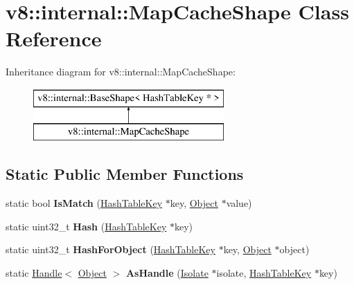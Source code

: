 \hypertarget{classv8_1_1internal_1_1_map_cache_shape}{}\section{v8\+:\+:internal\+:\+:Map\+Cache\+Shape Class Reference}
\label{classv8_1_1internal_1_1_map_cache_shape}
Inheritance diagram for v8\+:\+:internal\+:\+:Map\+Cache\+Shape\+:\begin{figure}[H]
\begin{center}
\leavevmode
\includegraphics[height=2.000000cm]{classv8_1_1internal_1_1_map_cache_shape}
\end{center}
\end{figure}
\subsection*{Static Public Member Functions}
\begin{DoxyCompactItemize}
\item 
\hypertarget{classv8_1_1internal_1_1_map_cache_shape_ab335975663862b94b68861fafc5661ee}{}static bool {\bfseries Is\+Match} (\hyperlink{classv8_1_1internal_1_1_hash_table_key}{Hash\+Table\+Key} $\ast$key, \hyperlink{classv8_1_1internal_1_1_object}{Object} $\ast$value)\label{classv8_1_1internal_1_1_map_cache_shape_ab335975663862b94b68861fafc5661ee}

\item 
\hypertarget{classv8_1_1internal_1_1_map_cache_shape_a90f50d2ad832b29efc03dd4655c62521}{}static uint32\+\_\+t {\bfseries Hash} (\hyperlink{classv8_1_1internal_1_1_hash_table_key}{Hash\+Table\+Key} $\ast$key)\label{classv8_1_1internal_1_1_map_cache_shape_a90f50d2ad832b29efc03dd4655c62521}

\item 
\hypertarget{classv8_1_1internal_1_1_map_cache_shape_a7888c7d67725463c7619383027e772a4}{}static uint32\+\_\+t {\bfseries Hash\+For\+Object} (\hyperlink{classv8_1_1internal_1_1_hash_table_key}{Hash\+Table\+Key} $\ast$key, \hyperlink{classv8_1_1internal_1_1_object}{Object} $\ast$object)\label{classv8_1_1internal_1_1_map_cache_shape_a7888c7d67725463c7619383027e772a4}

\item 
\hypertarget{classv8_1_1internal_1_1_map_cache_shape_a239d39325e255f318cd61829ef2b40c5}{}static \hyperlink{classv8_1_1internal_1_1_handle}{Handle}$<$ \hyperlink{classv8_1_1internal_1_1_object}{Object} $>$ {\bfseries As\+Handle} (\hyperlink{classv8_1_1internal_1_1_isolate}{Isolate} $\ast$isolate, \hyperlink{classv8_1_1internal_1_1_hash_table_key}{Hash\+Table\+Key} $\ast$key)\label{classv8_1_1internal_1_1_map_cache_shape_a239d39325e255f318cd61829ef2b40c5}

\end{DoxyCompactItemize}
